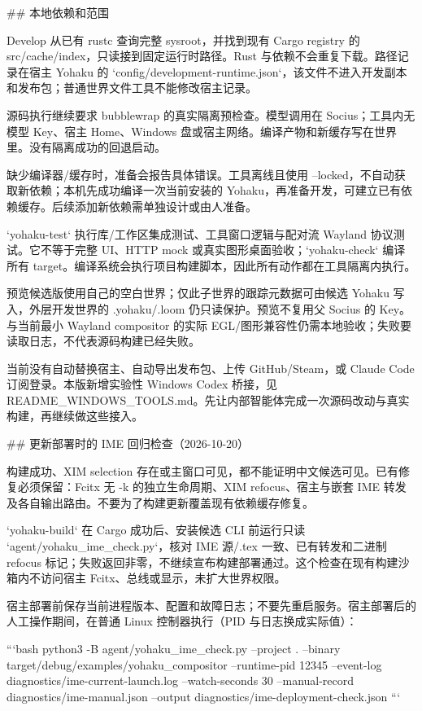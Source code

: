 ## 本地依赖和范围

Develop 从已有 rustc 查询完整 sysroot，并找到现有 Cargo registry 的 src/cache/index，只读接到固定运行时路径。Rust 与依赖不会重复下载。路径记录在宿主 Yohaku 的 `config/development-runtime.json`，该文件不进入开发副本和发布包；普通世界文件工具不能修改宿主记录。

源码执行继续要求 bubblewrap 的真实隔离预检查。模型调用在 Socius；工具内无模型 Key、宿主 Home、Windows 盘或宿主网络。编译产物和新缓存写在世界里。没有隔离成功的回退启动。

缺少编译器/缓存时，准备会报告具体错误。工具离线且使用 --locked，不自动获取新依赖；本机先成功编译一次当前安装的 Yohaku，再准备开发，可建立已有依赖缓存。后续添加新依赖需单独设计或由人准备。

`yohaku-test` 执行库/工作区集成测试、工具窗口逻辑与配对流 Wayland 协议测试。它不等于完整 UI、HTTP mock 或真实图形桌面验收；`yohaku-check` 编译所有 target。编译系统会执行项目构建脚本，因此所有动作都在工具隔离内执行。

预览候选版使用自己的空白世界；仅此子世界的跟踪元数据可由候选 Yohaku 写入，外层开发世界的 .yohaku/.loom 仍只读保护。预览不复用父 Socius 的 Key。与当前最小 Wayland compositor 的实际 EGL/图形兼容性仍需本地验收；失败要读取日志，不代表源码构建已经失败。

当前没有自动替换宿主、自动导出发布包、上传 GitHub/Steam，或 Claude Code 订阅登录。本版新增实验性 Windows Codex 桥接，见 README_WINDOWS_TOOLS.md。先让内部智能体完成一次源码改动与真实构建，再继续做这些接入。


## 更新部署时的 IME 回归检查（2026-10-20）

构建成功、XIM selection 存在或主窗口可见，都不能证明中文候选可见。已有修复必须保留：Fcitx 无 -k 的独立生命周期、XIM refocus、宿主与嵌套 IME 转发及各自输出路由。不要为了构建更新覆盖现有依赖缓存修复。

`yohaku-build` 在 Cargo 成功后、安装候选 CLI 前运行只读 `agent/yohaku_ime_check.py`，核对 IME 源/.tex 一致、已有转发和二进制 refocus 标记；失败返回非零，不继续宣布构建部署通过。这个检查在现有构建沙箱内不访问宿主 Fcitx、总线或显示，未扩大世界权限。

宿主部署前保存当前进程版本、配置和故障日志；不要先重启服务。宿主部署后的人工操作期间，在普通 Linux 控制器执行（PID 与日志换成实际值）：

```bash
python3 -B agent/yohaku_ime_check.py --project . --binary target/debug/examples/yohaku_compositor --runtime-pid 12345 --event-log diagnostics/ime-current-launch.log --watch-seconds 30 --manual-record diagnostics/ime-manual.json --output diagnostics/ime-deployment-check.json
```

